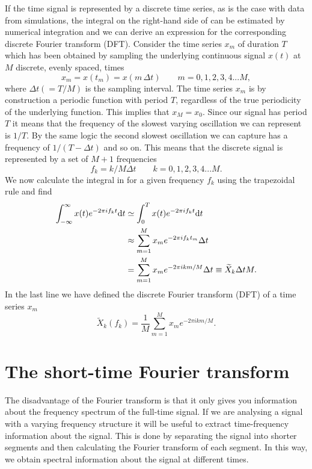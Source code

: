 If the time signal is represented by a discrete time series, as is the case with data from simulations,
the integral on the right-hand side of  can be estimated by numerical integration and 
we can derive an expression for the corresponding discrete Fourier transform (DFT).
Consider the time series $x_m$ of duration $T$ which has been obtained by sampling the underlying 
continuous signal $x(t)$ at $M$ discrete, evenly spaced, times
\begin{equation}
x_m = x(t_m) = x(m \, \Delta t) \qquad m = 0,1,2,3,4 ... M,
\end{equation} 
where $\Delta t( = T/M)$ is the sampling interval.
The time series $x_m$ is by construction a periodic function with period $T$, regardless of the true periodicity of the
underlying function. This implies that $x_M = x_0$. Since our signal has period $T$ it means that the frequency
of the slowest varying oscillation we can represent is $1/T$. By the same logic the second slowest oscillation 
we can capture has a frequency of $1/(T-\Delta t)$ and so on. This means that the discrete signal
is represented by a set of $M+1$ frequencies 
\begin{equation}
f_k = k/M \Delta t \qquad k = 0,1,2,3,4 ... M.
\end{equation}
We now calculate the integral in  for a given frequency $f_k$ using the trapezoidal rule and find
\begin{align} 
\int_{-\infty}^{\infty} x(t) e^{-2 \pi i f_k t} \mathrm{d} t &\simeq \int_{0}^{T} x(t) e^{-2 \pi i f_k t} \mathrm{d} t \nonumber \\
&\approx \sum_{m=1}^{M} x_m e^{-2 \pi i f_k t_m} \Delta t \nonumber \\
& = \sum_{m=1}^{M} x_m e^{-2 \pi i k m/M} \Delta t \equiv \widetilde{X}_k \Delta t M. \label{eqSA:dft1}
\end{align}
In the last line we have defined the discrete Fourier transform (DFT) of a time series $x_m$
\begin{equation} \label{eqSA:DFT}
\widetilde{X}_k (f_k) = \frac{1}{M}  \sum^M_{m=1} x_m e^{-2\pi i k m/M}.
\end{equation}

\section{The short-time Fourier transform}
The disadvantage of the Fourier transform is that it only gives you information
about the frequency spectrum of the full-time signal. If we are analysing a 
signal with a varying frequency structure it will be useful to extract time-frequency information about the signal. This is done by separating
the signal into shorter segments and then calculating the Fourier transform of each
segment. In this way, we obtain spectral information about the
signal at different times.

